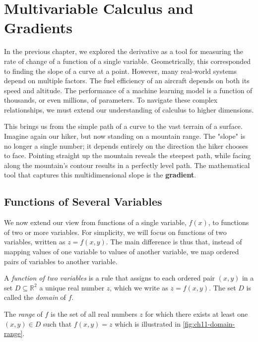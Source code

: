 \chapter{Multivariable Calculus and Gradients}
\label{chap:ch11}

In the previous chapter, we explored the derivative as a tool for measuring the rate of change of a function of a single variable. Geometrically, this corresponded to finding the slope of a curve at a point. However, many real-world systems depend on multiple factors. The fuel efficiency of an aircraft depends on both its speed and altitude. The performance of a machine learning model is a function of thousands, or even millions, of parameters. To navigate these complex relationships, we must extend our understanding of calculus to higher dimensions.

This brings us from the simple path of a curve to the vast terrain of a surface. Imagine again our hiker, but now standing on a mountain range. The "slope" is no longer a single number; it depends entirely on the direction the hiker chooses to face. Pointing straight up the mountain reveals the steepest path, while facing along the mountain's contour results in a perfectly level path. The mathematical tool that captures this multidimensional slope is the \textbf{gradient}.


\section{Functions of Several Variables}

We now extend our view from functions of a single variable, \(f(x)\), to functions of two or more variables. For simplicity, we will focus on functions of two variables, written as \(z = f(x, y)\). The main difference is thus that, instead of mapping values of one variable to values of another variable, we map ordered pairs of variables to another variable.

\begin{definition}
A \emph{function of two variables} is a rule that assigns to each ordered pair \((x, y)\) in a set \(D \subseteq \mathbb{R}^2\) a unique real number \(z\), which we write as \(z = f(x, y)\). The set \(D\) is called the \emph{domain} of \(f\).

The \emph{range} of \(f\) is the set of all real numbers \(z\) for which there exists at least one \((x, y) \in D\) such that \(f(x, y) = z\) which is illustrated in \autoref{fig:ch11-domain-range}.
\end{definition}

